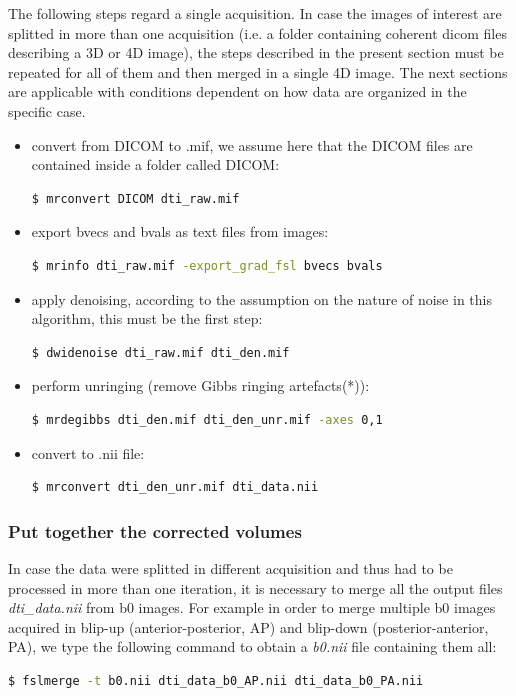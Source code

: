 \documentclass[a4paper,11pt]{article}
\begin{document}
The following steps regard a single acquisition. In case the images of interest are splitted in more than one acquisition (i.e. a folder containing coherent dicom files describing a 3D or 4D image), the steps described in the present section must be repeated for all of them and then merged in a single 4D image. The next sections are applicable with conditions dependent on how data are organized in the specific case. 

\begin{itemize}

\item convert from DICOM to .mif, we assume here that the DICOM files are contained inside a folder called DICOM:
\begin{lstlisting}[language=bash]
$ mrconvert DICOM dti_raw.mif 
\end{lstlisting}

\item export bvecs and bvals as text files from images:
\begin{lstlisting}[language=bash]
$ mrinfo dti_raw.mif -export_grad_fsl bvecs bvals
\end{lstlisting}

\item apply denoising, according to the assumption on the nature of noise in this 
algorithm, this must be the first step:
\begin{lstlisting}[language=bash]
$ dwidenoise dti_raw.mif dti_den.mif
\end{lstlisting}

\item perform unringing (remove Gibbs ringing artefacts(*)):
\begin{lstlisting}[language=bash]
$ mrdegibbs dti_den.mif dti_den_unr.mif -axes 0,1
\end{lstlisting}

\item convert to .nii file:
\begin{lstlisting}[language=bash]
$ mrconvert dti_den_unr.mif dti_data.nii
\end{lstlisting}

\end{itemize}

\subsubsection{Put together the corrected volumes}
In case the data were splitted in different acquisition and thus had to be processed in more than one iteration, it is necessary to merge all the output files \emph{dti\_data.nii} from b0 images. For example in order to merge multiple b0 images acquired in blip-up (anterior-posterior, AP) and blip-down (posterior-anterior, PA), we type the following command to obtain a \emph{b0.nii} file containing them all:
\begin{lstlisting}[language=bash]
$ fslmerge -t b0.nii dti_data_b0_AP.nii dti_data_b0_PA.nii
\end{lstlisting}
\end{document}
